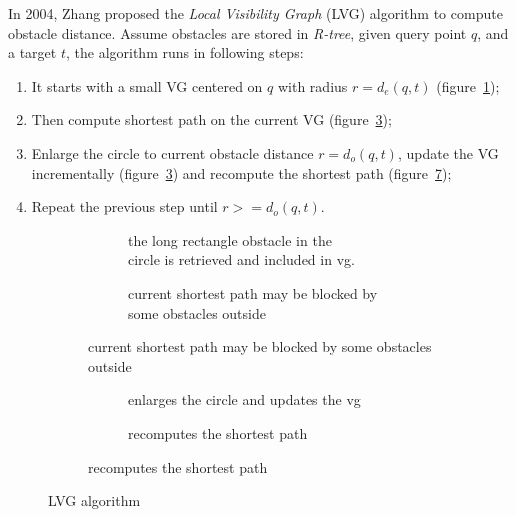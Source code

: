 In 2004, Zhang proposed the \textit{Local Visibility Graph} (LVG) algorithm\cite{zhang2004spatial}
to compute obstacle distance.
Assume obstacles are stored in \textit{R-tree},
given query point $q$, and a target $t$, the algorithm runs in
following steps:
\begin{enumerate}
    \item It starts with a small VG centered on $q$ with radius $r=d_e(q, t)$ (figure~\ref{edbt1});
    \item Then compute shortest path on the current VG (figure~\ref{edbt2});
    \item Enlarge the circle to current obstacle distance $r=d_o(q,t)$, update the VG
      incrementally (figure~\ref{edbt2}) and recompute the shortest path (figure~\ref{edbt4});
    \item Repeat the previous step until $r>=d_o(q, t)$.
\end{enumerate}

\begin{figure}[!h]
  \begin{subfigure}{\linewidth}
    \centering
    \begin{subfigure}{.45\linewidth}
      \centering
      
      \caption{
        \small 
        the long rectangle obstacle in the\\
        circle is retrieved and included in vg.
      }
      \label{edbt1}
    \end{subfigure}%
    \begin{subfigure}{.45\linewidth}
      \centering
      
      \caption{
        \small current shortest path may be blocked by some obstacles outside
      }
      \label{edbt2}
    \end{subfigure}
  \end{subfigure}\par\medskip
  \begin{subfigure}{\linewidth}
    \centering
    \begin{subfigure}{.45\linewidth}
      \centering
      
      \caption{
        \small enlarges the circle and updates the vg
      }
      \label{edbt3}
    \end{subfigure}%
    \begin{subfigure}{.45\linewidth}
      \centering
      
      \caption{
        \small recomputes the shortest path  
      }
      \label{edbt4}
    \end{subfigure}
  \end{subfigure}
  \caption{\small LVG algorithm}
\end{figure}

